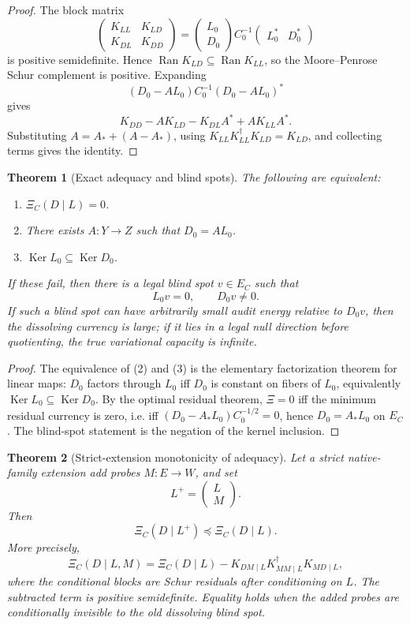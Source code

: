 \documentclass[11pt]{article}
\newtheorem{theorem}{Theorem}[section]
\DeclareMathOperator{\Ran}{Ran}
\DeclareMathOperator{\Ker}{Ker}
\begin{document}
\begin{proof}
The block matrix
\[
  \begin{pmatrix}
    K_{LL} & K_{LD}\\
    K_{DL} & K_{DD}
  \end{pmatrix}
  =
  \begin{pmatrix}L_0\\D_0\end{pmatrix}
  C_0^{-1}
  \begin{pmatrix}L_0^*&D_0^*\end{pmatrix}
\]
is positive semidefinite.  Hence \(\Ran K_{LD}\subseteq\Ran K_{LL}\), so the Moore--Penrose Schur complement is positive.  Expanding
\[
  (D_0-AL_0)C_0^{-1}(D_0-AL_0)^*
\]
gives
\[
  K_{DD}-AK_{LD}-K_{DL}A^*+AK_{LL}A^*.
\]
Substituting \(A=A_*+(A-A_*)\), using \(K_{LL}K_{LL}^\dagger K_{LD}=K_{LD}\), and collecting terms gives the identity.
\end{proof}

\begin{theorem}[Exact adequacy and blind spots]
The following are equivalent:
\begin{enumerate}
  \item \(\Xi_C(D\mid L)=0\).
  \item There exists \(A:Y\to Z\) such that \(D_0=AL_0\).
  \item \(\Ker L_0\subseteq\Ker D_0\).
\end{enumerate}
If these fail, then there is a legal blind spot \(v\in E_C\) such that
\[
  L_0v=0,
  \qquad
  D_0v\ne0.
\]
If such a blind spot can have arbitrarily small audit energy relative to \(D_0v\), then the dissolving currency is large; if it lies in a legal null direction before quotienting, the true variational capacity is infinite.
\end{theorem}

\begin{proof}
The equivalence of (2) and (3) is the elementary factorization theorem for linear maps: \(D_0\) factors through \(L_0\) iff \(D_0\) is constant on fibers of \(L_0\), equivalently \(\Ker L_0\subseteq\Ker D_0\).  By the optimal residual theorem, \(\Xi=0\) iff the minimum residual currency is zero, i.e. iff \((D_0-A_*L_0)C_0^{-1/2}=0\), hence \(D_0=A_*L_0\) on \(E_C\).  The blind-spot statement is the negation of the kernel inclusion.
\end{proof}

\begin{theorem}[Strict-extension monotonicity of adequacy]
Let a strict native-family extension add probes \(M:E\to W\), and set
\[
  L^+=\begin{pmatrix}L\\M\end{pmatrix}.
\]
Then
\[
  \boxed{\Xi_C(D\mid L^+)\preceq\Xi_C(D\mid L).}
\]
More precisely,
\[
  \Xi_C(D\mid L,M)
  =\Xi_C(D\mid L)-K_{DM\mid L}K_{MM\mid L}^\dagger K_{MD\mid L},
\]
where the conditional blocks are Schur residuals after conditioning on \(L\).  The subtracted term is positive semidefinite.  Equality holds when the added probes are conditionally invisible to the old dissolving blind spot.
\end{theorem}
\end{document}
